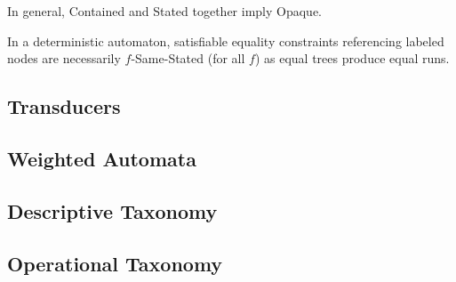 In general, Contained and Stated together imply Opaque.

In a deterministic automaton, satisfiable equality constraints referencing
labeled nodes are necessarily $f$-Same-Stated (for all $f$) as equal trees
produce equal runs.

\subsection{Transducers}

\subsection{Weighted Automata}

\subsection{Descriptive Taxonomy}

\subsection{Operational Taxonomy}
